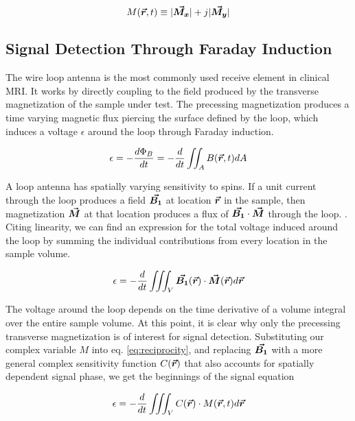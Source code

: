 \begin{equation}\label{eq:M_complex}
    M(\bm{\vec{r}},t) \equiv |\bm{\vec{M_x}}| + j |\bm{\vec{M_y}}|
\end{equation}

\subsection{Signal Detection Through Faraday Induction}
The wire loop antenna is the most commonly used receive element in clinical MRI. It works by directly coupling to the
field produced by the transverse magnetization of the sample under test. The precessing magnetization produces a time
varying magnetic flux piercing the surface defined by the loop, which induces a voltage $\epsilon$ around the loop
through Faraday induction.

\begin{equation}\label{eq:faraday_induction}
    \epsilon = - \frac{d \Phi_B}{dt} = -\frac{d}{dt} \iint_A B(\bm{\vec{r}},t) dA
\end{equation}

A loop antenna has spatially varying sensitivity to spins. If a unit current through the loop produces a field
$\bm{\vec{B_1}}$ at location $\bm{\vec{r}}$ in the sample, then magnetization $\bm{\vec{M}}$ at that location produces a flux of
$\bm{\vec{B_1}} \cdot \bm{\vec{M}}$ through the loop.  \cite{Hoult1979}. Citing linearity, we can find an expression for the
total voltage induced around the loop by summing the individual contributions from every location in the sample volume.

\begin{equation}\label{eq:reciprocity}
    \epsilon = -\frac{d}{dt} \iiint_V \bm{\vec{B_1}}(\bm{\vec{r}}) \cdot \bm{\vec{M}}(\bm{\vec{r}}) d\bm{\vec{r}}
\end{equation}

The voltage around the loop depends on the time derivative of a volume integral over the entire sample volume. At this
point, it is clear why only the precessing transverse magnetization is of interest for signal detection. Substituting
our complex variable $M$ into eq. \ref{eq:reciprocity}, and replacing $\bm{\vec{B_1}}$ with a more general complex sensitivity
function $C(\bm{\vec{r}})$ that also accounts for spatially dependent signal phase, we get the beginnings of the signal
equation

\begin{equation}\label{eq:signal_1}
    \epsilon = -\frac{d}{dt} \iiint_V C(\bm{\vec{r}}) \cdot M(\bm{\vec{r}},t) d\bm{\vec{r}}
\end{equation}

